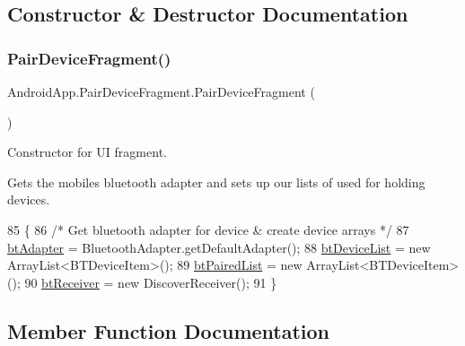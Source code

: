 \subsection{Constructor \& Destructor Documentation}
\mbox{\label{class_android_app_1_1_pair_device_fragment_a0abb8db1228e66ff5073816588c77415}} 
\subsubsection{\texorpdfstring{Pair\+Device\+Fragment()}{PairDeviceFragment()}}
{\footnotesize\ttfamily Android\+App.\+Pair\+Device\+Fragment.\+Pair\+Device\+Fragment (\begin{DoxyParamCaption}{ }\end{DoxyParamCaption})\hspace{0.3cm}{\ttfamily [inline]}}



Constructor for UI fragment. 

Get\textquotesingle{}s the mobile\textquotesingle{}s bluetooth adapter and sets up our lists of used for holding devices. 
\begin{DoxyCode}
85     \{
86         \textcolor{comment}{/* Get bluetooth adapter for device & create device arrays */}
87         \hyperlink{class_android_app_1_1_pair_device_fragment_a54c71cf078647dbcd55742fc31a0a191}{btAdapter} = BluetoothAdapter.getDefaultAdapter();
88         \hyperlink{class_android_app_1_1_pair_device_fragment_ac375aedac2d098332a1af1cf696f50a3}{btDeviceList} = \textcolor{keyword}{new} ArrayList<BTDeviceItem>();
89         \hyperlink{class_android_app_1_1_pair_device_fragment_ab87b3da6318565e92d422a84685ab5b2}{btPairedList} = \textcolor{keyword}{new} ArrayList<BTDeviceItem>();
90         \hyperlink{class_android_app_1_1_pair_device_fragment_ada8ba66b955864829786ffcada7f5948}{btReceiver} = \textcolor{keyword}{new} DiscoverReceiver();
91     \}
\end{DoxyCode}


\subsection{Member Function Documentation}
\mbox{\label{class_android_app_1_1_pair_device_fragment_af20a6287fc02c251141fef1c24b5e911}} 
